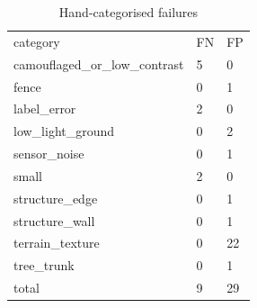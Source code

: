 \begin{table}[t]\centering\small\caption{Hand-categorised failures}
\label{tab:t6failures}
\begin{tabular}{|lll|}\hline
category & FN & FP\\
camouflaged_or_low_contrast & 5 & 0\\
fence & 0 & 1\\
label_error & 2 & 0\\
low_light_ground & 0 & 2\\
sensor_noise & 0 & 1\\
small & 2 & 0\\
structure_edge & 0 & 1\\
structure_wall & 0 & 1\\
terrain_texture & 0 & 22\\
tree_trunk & 0 & 1\\
total & 9 & 29\\
\hline\end{tabular}\end{table}
